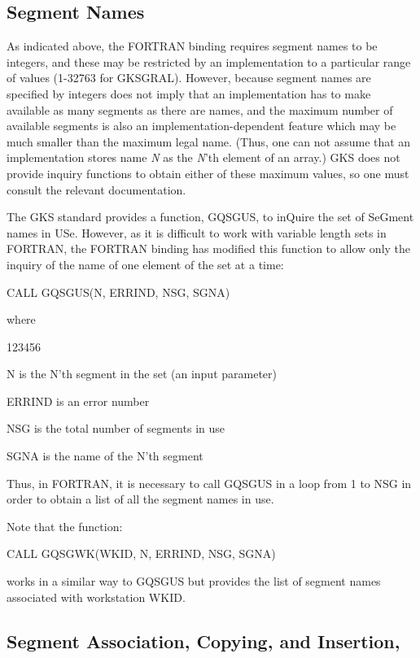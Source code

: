 \subsection{\protect\label{sec:segnam}Segment Names}
 
As indicated above, the FORTRAN binding requires segment names to be
integers, and these may be restricted by an implementation to a particular
range of values (1-32763 for GKSGRAL). However, because segment names
are specified by integers does not imply that an implementation has to
make available as many segments as there are names, and the maximum
number of available segments is also an implementation-dependent feature
which may be much smaller than the maximum legal name.
(Thus, one can not assume that an implementation stores name {\it N}
as the {\it N}'th element of an array.)
GKS does not provide inquiry functions to obtain either of these maximum
values, so one must consult the relevant documentation.
 
The GKS standard provides a function, GQSGUS, to inQuire the set of SeGment
names in USe. However, as it is difficult to work with variable length
sets in FORTRAN, the FORTRAN binding has modified this function to allow
only the inquiry of the name of one element of the set at a time:
\begin{XMP}
CALL GQSGUS(N, ERRIND, NSG, SGNA)
\end{XMP}
where
\begin{DLtt}{123456}
\item[N]is the N'th segment in the set (an input parameter)
\item[ERRIND]is an error number
\item[NSG]is the total number of segments in use
\item[SGNA]is the name of the N'th segment
\end{DLtt}
Thus, in FORTRAN, it is necessary to call GQSGUS in a loop from 1 to NSG
in order to obtain a list of all the segment names in use.
 
Note that the function:
\begin{XMP}
CALL GQSGWK(WKID, N, ERRIND, NSG, SGNA)
\end{XMP}
works in a similar way to GQSGUS but provides the list of segment names
associated with workstation WKID.
\subsection{\protect\label{sec:segasi}Segment Association, Copying, and Insertion,}
 
